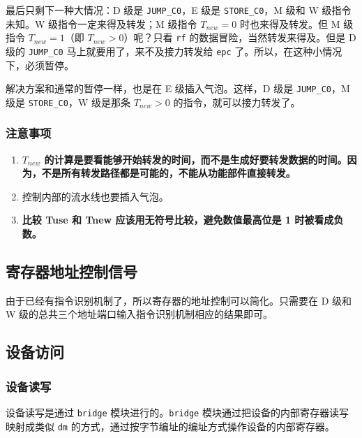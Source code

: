 \documentclass[12pt,AutoFakeBold,AutoFakeSlant]{article}
\providecommand{\tightlist}{%
  \setlength{\itemsep}{0pt}\setlength{\parskip}{0pt}}
\newcommand{\ms}[1]{\texttt{#1}}
\begin{document}
最后只剩下一种大情况：D 级是 \ms{JUMP\_C0}，E 级是 \ms{STORE\_C0}，M 级和 W 级指令未知。W 级指令一定来得及转发；M 级指令 $ T_{new} = 0 $ 时也来得及转发。但 M 级指令 $ T_{new} = 1 $（即 $ T_{new} > 0 $）呢？只看 \ms{rf} 的数据冒险，当然转发来得及。但是 D 级的 \ms{JUMP\_C0} 马上就要用了，来不及接力转发给 \ms{epc} 了。所以，在这种小情况下，必须暂停。

解决方案和通常的暂停一样，也是在 E 级插入气泡。这样，D 级是 \ms{JUMP\_C0}，M 级是 \ms{STORE\_C0}，W 级是那条 $ T_{new} > 0 $ 的指令，就可以接力转发了。

\subsubsection{注意事项}

\begin{enumerate}
\tightlist
\item
\textbf{$ T_{new} $
的计算是要看能够开始转发的时间，而不是生成好要转发数据的时间。因为，不是所有转发路径都是可能的，不能从功能部件直接转发。}
\item
控制内部的流水线也要插入气泡。
\item
\textbf{比较 Tuse 和 Tnew 应该用无符号比较，避免数值最高位是 1 时被看成负数。}
\end{enumerate}

\hypertarget{ux5bc4ux5b58ux5668ux5730ux5740ux63a7ux5236ux4fe1ux53f7}{%
\subsection{寄存器地址控制信号}\label{ux5bc4ux5b58ux5668ux5730ux5740ux63a7ux5236ux4fe1ux53f7}}

由于已经有指令识别机制了，所以寄存器的地址控制可以简化。只需要在 D 级和 W 级的总共三个地址端口输入指令识别机制相应的结果即可。

\hypertarget{ux8bbeux5907ux8bbfux95ee}{%
\subsection{设备访问}\label{ux8bbeux5907ux8bbfux95ee}}

\hypertarget{ux8bbeux5907ux8bfbux5199}{%
\subsubsection{设备读写}\label{ux8bbeux5907ux8bfbux5199}}

设备读写是通过 \texttt{bridge} 模块进行的。\texttt{bridge} 模块通过把设备的内部寄存器读写映射成类似 \texttt{dm} 的方式，通过按字节编址的编址方式操作设备的内部寄存器。
\end{document}
